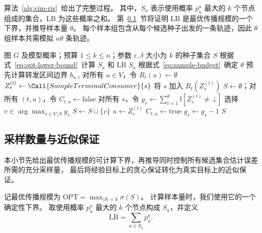 算法~\ref{alg:cim-ris}~给出了完整过程。
其中，$S_a$ 表示使用概率 $p_u^a$ 最大的 $k$ 个节点组成的集合，$\mathrm{LB}$ 为这些概率之和。
第~\ref{sec:theoretical-guarantees}~节将证明 $\mathrm{LB}$ 是最优传播规模的一个下界，并推导样本量 $\theta$。
每个样本组包含从每个候选种子出发的一条轨迹，因此 $\theta$ 组样本共需模拟 $n\theta$ 条轨迹。

\begin{algorithm}[t]
\caption{\CIMRIS{}：轨迹采样与覆盖贪心}
\label{alg:cim-ris}
\begin{algorithmic}[1]
\Require 图 $G$ 及模型概率；预算 $1\le k\le n$；参数 $\varepsilon,\delta$
\Ensure 大小为 $k$ 的种子集合 $S$
\State 根据式~\eqref{eq:opt-lower-bound}~计算 $S_a$ 和 $\mathrm{LB}$
  \State \Return $S_a$
\EndIf
\State 根据式~\eqref{eq:sample-budget}~确定 $\theta$
\State 预先计算转发区间边界 $b_{u,i}$
  \State 对所有 $u\in V$，令 $R_t(u)\gets\emptyset$
    \State $Z_s^{(t)}\gets\Call{SampleTerminalConsumer}{s}$
      \State 将 $s$ 加入 $R_t(Z_s^{(t)})$
    \EndIf
  \EndFor
\EndFor
\State $S\gets\emptyset$；对所有 $(t,u)$，令 $C_{t,u}\gets\mathrm{false}$
\State 对所有 $s$，令 $g_s\gets\sum_{t=1}^\theta\mathbb{I}[Z_s^{(t)}\ne\bot]$
  \State 选择 $v\in\arg\max_{s\in V\setminus S}g_s$
  \State $S\gets S\cup\{v\}$
    \State $u\gets Z_v^{(t)}$
        \State $C_{t,u}\gets\mathrm{true}$
          \State $g_s\gets g_s-1$
        \EndFor
      \EndIf
    \EndIf
  \EndFor
\EndFor
\State \Return $S$
\end{algorithmic}
\end{algorithm}

\subsection{采样数量与近似保证}
\label{sec:theoretical-guarantees}

本小节先给出最优传播规模的可计算下界，再推导同时控制所有候选集合估计误差所需的充分采样量，
最后将经验目标上的贪心保证转化为真实目标上的近似保证。

记最优传播规模为 $\mathrm{OPT}=\max_{|S|=k}\sigma(S)$。
计算样本量时，我们使用它的一个确定性下界。
取使用概率 $p_u^a$ 最大的 $k$ 个节点构成 $S_a$，并定义
\begin{equation}
\label{eq:opt-lower-bound}
 \mathrm{LB}=\sum_{u\in S_a}p_u^a.
\end{equation}

